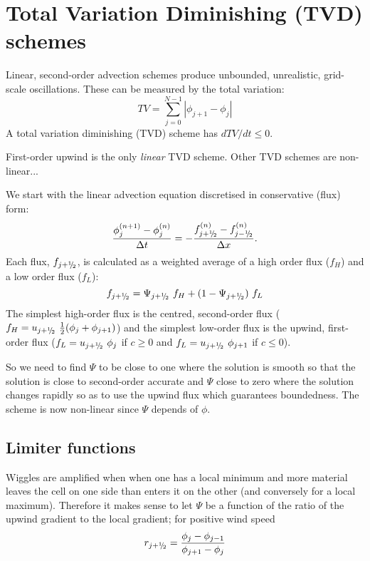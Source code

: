 \clearpage
\section{Total Variation Diminishing (TVD) schemes}

Linear, second-order advection schemes produce unbounded, unrealistic, grid-scale oscillations. These can be measured by the total variation:
\begin{equation*}
TV = \sum_{j=0}^{N-1}|\phi_{j+1}-\phi_j|
\end{equation*}
A total variation diminishing (TVD) scheme has $dTV/dt \le 0$.

First-order upwind is the only {\em linear} TVD scheme. Other TVD schemes are non-linear...

We start with the linear advection equation discretised in conservative (flux) form:
\begin{equation}
\frac{\phi_j^{(n+1)} - \phi_j^{(n)}}{\Delta t} = -\frac{f_{j+{^1\negthickspace/\negthinspace_2}}^{(n)} - f_{j-{^1\negthickspace/\negthinspace_2}}^{(n)}}{\Delta x}.
\end{equation}
Each flux, $f_{j+{^1\negthickspace/\negthinspace_2}}$, is calculated as a weighted average of a high order flux ($f_H$) and a low order flux ($f_L$):
\begin{equation*}
f_{j+{^1\negthickspace/\negthinspace_2}} = \Psi_{j+{^1\negthickspace/\negthinspace_2}} ~f_H + (1-\Psi_{j+{^1\negthickspace/\negthinspace_2}}) ~f_L
\end{equation*}
The simplest high-order flux is the centred, second-order flux ($f_H=u_{j+{^1\negthickspace/\negthinspace_2}} ~\tfrac{1}{2}(\phi_{j} + \phi_{j+1})$) and the simplest low-order flux is the upwind, first-order flux ($f_L=u_{j+{^1\negthickspace/\negthinspace_2}}~ \phi_j$ if $c\ge 0$ and $f_L=u_{j+{^1\negthickspace/\negthinspace_2}}~ \phi_{j+1}$ if $c\le 0$).

So we need to find $\Psi$ to be close to one where the solution is smooth so that the solution is close to second-order accurate and $\Psi$ close to zero where the solution changes rapidly so as to use the upwind flux which guarantees boundedness. The scheme is now non-linear since $\Psi$ depends of $\phi$.


\clearpage
\subsection{Limiter functions}

Wiggles are amplified when when one has a local minimum and more material leaves the cell on one side than enters it on the other (and conversely for a local maximum). Therefore it makes sense to let $\Psi$ be a function
of the ratio of the upwind gradient to the local gradient; for positive wind speed
\begin{equation*}
r_{j+{^1\negthickspace/\negthinspace_2}} = \frac{\phi_j - \phi_{j-1}}{\phi_{j+1} - \phi_j}
\end{equation*}

